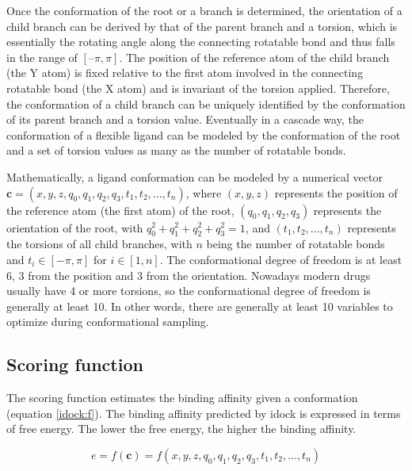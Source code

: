 Once the conformation of the root or a branch is determined, the orientation of a child branch can be derived by that of the parent branch and a torsion, which is essentially the rotating angle along the connecting rotatable bond and thus falls in the range of $[–\pi, \pi]$. The position of the reference atom of the child branch (the Y atom) is fixed relative to the first atom involved in the connecting rotatable bond (the X atom) and is invariant of the torsion applied. Therefore, the conformation of a child branch can be uniquely identified by the conformation of its parent branch and a torsion value. Eventually in a cascade way, the conformation of a flexible ligand can be modeled by the conformation of the root and a set of torsion values as many as the number of rotatable bonds.

Mathematically, a ligand conformation can be modeled by a numerical vector $\mathbf c=(x, y, z, q_0, q_1, q_2, q_3, t_1, t_2, ..., t_n)$, where $(x, y, z)$ represents the position of the reference atom (the first atom) of the root, $(q_0, q_1, q_2, q_3)$ represents the orientation of the root, with $q_0^2+q_1^2+q_2^2+q_3^2=1$, and $(t_1, t_2, ..., t_n)$ represents the torsions of all child branches, with $n$ being the number of rotatable bonds and $t_i\in[-\pi, \pi]$ for $i\in[1, n]$. The conformational degree of freedom is at least 6, 3 from the position and 3 from the orientation. Nowadays modern drugs usually have 4 or more torsions, so the conformational degree of freedom is generally at least 10. In other words, there are generally at least 10 variables to optimize during conformational sampling.

\subsection{Scoring function}

The scoring function estimates the binding affinity given a conformation (equation \eqref{idock:f}). The binding affinity predicted by idock is expressed in terms of free energy. The lower the free energy, the higher the binding affinity.

\begin{equation}
\label{idock:f}
e = f(\mathbf c) = f(x, y, z, q_0, q_1, q_2, q_3, t_1, t_2, ..., t_n)
\end{equation}

